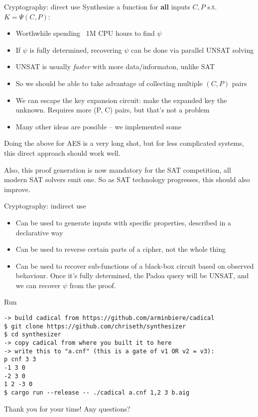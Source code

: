 \documentclass[aspectratio=169]{beamer}
\begin{document}
\begin{frame}{Cryptography: direct use}
Synthesize a function for \textbf{all} inputs $C, P$ s.t. $K=\Psi(C, P)$:
\begin{itemize}
    \item Worthwhile spending ~1M CPU hours to find $\psi$
    \item If $\psi$ is fully determined, recovering $\psi$
        can be done via parallel UNSAT solving
    \item UNSAT is usually \emph{faster} with more data/informaton, unlike SAT
    \item So we should be able to take advantage of collecting multiple $(C,
        P)$ pairs
    \item We can escape the key expansion circuit: make the expanded key the
        unknown. Requires more (P, C) pairs, but that's not a problem
    \item Many other ideas are possible -- we implemented some
\end{itemize}
\bigskip

Doing the above for AES is a very long shot, but for less complicated systems,
this direct approach should work well.

Also, this proof generation is now mandatory for the SAT competition,
all modern SAT solvers emit one. So as SAT technology progresses,
this should also improve.
\end{frame}

\begin{frame}{Cryptography: indirect use}
\begin{itemize}
    \item Can be used to generate inputs with specific properties,
        described in a declarative way
    \item Can be used to reverse certain parts of a cipher, not the
        whole thing
    \item Can be used to recover sub-functions of a black-box circuit
        based on observed behaviour. Once it's fully determined,
        the Padoa query will be UNSAT, and we can recover $\psi$
        from the proof.
\end{itemize}
\end{frame}

\begin{frame}[fragile]{Run}
\begin{verbatim}
-> build cadical from https://github.com/arminbiere/cadical
$ git clone https://github.com/chriseth/synthesizer
$ cd synthesizer
-> copy cadical from where you built it to here
-> write this to "a.cnf" (this is a gate of v1 OR v2 = v3):
p cnf 3 3
-1 3 0
-2 3 0
1 2 -3 0
$ cargo run --release -- ./cadical a.cnf 1,2 3 b.aig
\end{verbatim}
\end{frame}

\begin{frame}{Thank you for your time!}
    Any questions?
\end{frame}
\end{document}

